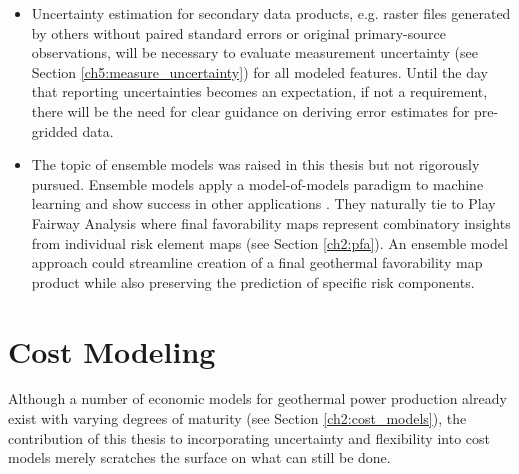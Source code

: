 \begin{itemize}
    \item Uncertainty estimation for secondary data products, e.g. raster files generated by others without paired standard errors or original primary-source observations, will be necessary to evaluate measurement uncertainty (see Section \ref{ch5:measure_uncertainty}) for all modeled features. Until the day that reporting uncertainties becomes an expectation, if not a requirement, there will be the need for clear guidance on deriving error estimates for pre-gridded data.
    \item The topic of ensemble models was raised in this thesis but not rigorously pursued. Ensemble models apply a model-of-models paradigm to machine learning and show success in other applications \citep[e.g.,][]{wilson_machine_2020}. They naturally tie to Play Fairway Analysis where final favorability maps represent combinatory insights from individual risk element maps (see Section \ref{ch2:pfa}). An ensemble model approach could streamline creation of a final geothermal favorability map product while also preserving the prediction of specific risk components.
\end{itemize}

\section{Cost Modeling}\label{ch9:future_work_cm}
Although a number of economic models for geothermal power production already exist with varying degrees of maturity (see Section \ref{ch2:cost_models}), the contribution of this thesis to incorporating uncertainty and flexibility into cost models merely scratches the surface on what can still be done.

